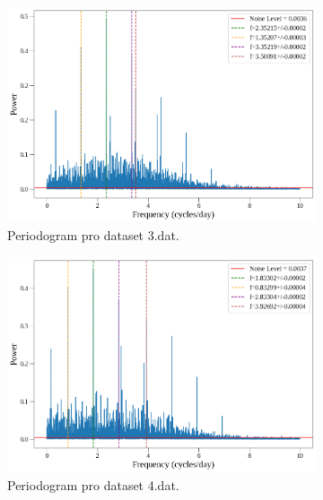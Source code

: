 \documentclass[a4paper,11pt,twocolumn]{article}
\begin{document}
\begin{figure}
                \begin{subfigure}[t]{0.48\textwidth}
                    \centering
                    \includegraphics[width=\textwidth]{3_per.png}
                    \caption{Periodogram pro dataset 3.dat.}
                    \label{fig:3_per}
                \end{subfigure}
                \vspace{10pt}
                \begin{subfigure}[t]{0.48\textwidth}
                    \centering
                    \includegraphics[width=\textwidth]{4_per.png}
                    \caption{Periodogram pro dataset 4.dat.}
                    \label{fig:4_per}
                \end{subfigure}
                \hfill
                \begin{subfigure}[t]{0.48\textwidth}

\end{subfigure}
\end{figure}
\end{document}
